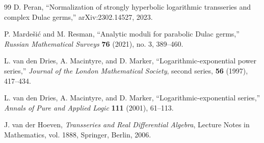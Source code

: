 \documentclass[11pt,openany]{book}
\theoremstyle{definition}
\theoremstyle{plain}
\theoremstyle{remark}
\begin{document}
\begin{thebibliography}{99}
D. Peran,
``Normalization of strongly hyperbolic logarithmic transseries and complex Dulac germs,''
arXiv:2302.14527, 2023.

P. Marde\v{s}i\'c and M. Resman,
``Analytic moduli for parabolic Dulac germs,''
\emph{Russian Mathematical Surveys} \textbf{76} (2021), no. 3, 389--460.

L. van den Dries, A. Macintyre, and D. Marker,
``Logarithmic-exponential power series,''
\emph{Journal of the London Mathematical Society}, second series,
\textbf{56} (1997), 417--434.

L. van den Dries, A. Macintyre, and D. Marker,
``Logarithmic-exponential series,''
\emph{Annals of Pure and Applied Logic} \textbf{111} (2001), 61--113.

J. van der Hoeven,
\emph{Transseries and Real Differential Algebra},
Lecture Notes in Mathematics, vol. 1888,
Springer, Berlin, 2006.

\end{thebibliography}

\printindex
\end{document}
